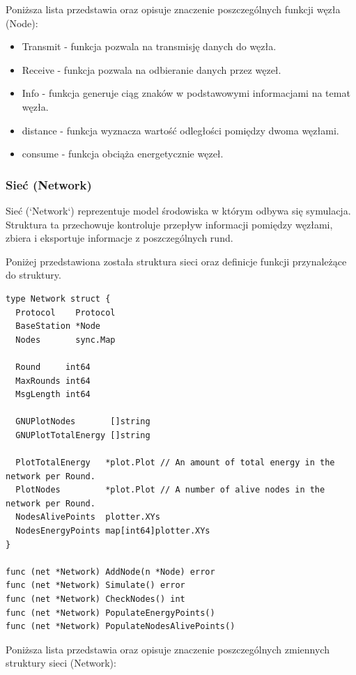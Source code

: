 \documentclass[a4paper,12pt,twoside,openany]{report}
\begin{document}
Poniższa lista przedstawia oraz opisuje znaczenie poszczególnych funkcji węzła (Node):

\begin{itemize}
 \item Transmit - funkcja pozwala na transmisję danych do węzła.
 \item Receive - funkcja pozwala na odbieranie danych przez węzeł.
 \item Info - funkcja generuje ciąg znaków w podstawowymi informacjami na temat węzła.
 \item distance - funkcja wyznacza wartość odległości pomiędzy dwoma węzłami.
 \item consume - funkcja obciąża energetycznie węzeł.
\end{itemize}

\subsubsection{Sieć (Network)}

Sieć (`Network`) reprezentuje model środowiska w którym odbywa się symulacja. Struktura ta przechowuje kontroluje przepływ informacji pomiędzy węzłami,
zbiera i eksportuje informacje z poszczególnych rund.

Poniżej przedstawiona została struktura sieci oraz definicje funkcji przynależące do struktury.

\begin{lstlisting}
type Network struct {
  Protocol    Protocol
  BaseStation *Node
  Nodes       sync.Map

  Round     int64
  MaxRounds int64
  MsgLength int64

  GNUPlotNodes       []string
  GNUPlotTotalEnergy []string

  PlotTotalEnergy   *plot.Plot // An amount of total energy in the network per Round.
  PlotNodes         *plot.Plot // A number of alive nodes in the network per Round.
  NodesAlivePoints  plotter.XYs
  NodesEnergyPoints map[int64]plotter.XYs
}

func (net *Network) AddNode(n *Node) error
func (net *Network) Simulate() error
func (net *Network) CheckNodes() int
func (net *Network) PopulateEnergyPoints()
func (net *Network) PopulateNodesAlivePoints()
\end{lstlisting}

Poniższa lista przedstawia oraz opisuje znaczenie poszczególnych zmiennych struktury sieci (Network):
\end{document}
